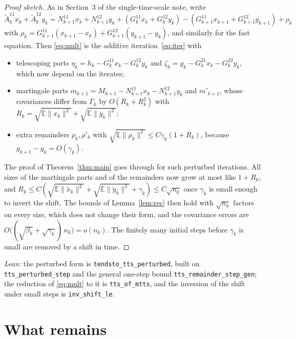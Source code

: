 \documentclass[11pt]{article}
\theoremstyle{definition}
\theoremstyle{remark}
\newcommand{\E}{\mathbb{E}}
\begin{document}
\begin{proof}[Proof sketch]
As in Section~3 of the single-time-scale note, write
$\tilde A^{11}_kx_k + \tilde A^{12}_ky_k = N^{11}_{k+1}x_k + N^{12}_{k+1}y_k + (G^{11}_kx_k + G^{12}_ky_k)
- (G^{11}_{k+1}x_{k+1} + G^{12}_{k+1}y_{k+1}) + \rho_k$ with
$\rho_k = G^{11}_{k+1}(x_{k+1} - x_k) + G^{12}_{k+1}(y_{k+1} - y_k)$, and similarly for the fast
equation. Then \eqref{eq:mult} is the additive iteration~\eqref{eq:iter} with
\begin{itemize}
\item telescoping parts $\eta_k = h_k - G^{11}_kx_k - G^{12}_ky_k$ and $\zeta_k = g_k - G^{21}_kx_k - G^{22}_ky_k$,
  which now depend on the iterates;
\item martingale parts $m_{k+1} = M_{k+1} - N^{11}_{k+1}x_k - N^{12}_{k+1}y_k$ and $m'_{k+1}$, whose
  covariances differ from $\Gamma_k$ by $O(R_k + R_k^2)$ with $R_k = \sqrt{\E\|x_k\|^2} + \sqrt{\E\|y_k\|^2}$;
\item extra remainders $\rho_k, \rho'_k$ with $\sqrt{\E\|\rho_k\|^2} \le C\gamma_k(1 + R_k)$, because
  $y_{k+1} - y_k = O(\gamma_k)$.
\end{itemize}
The proof of Theorem~\ref{thm:main} goes through for such perturbed iterations. All sizes of
the martingale parts and of the remainders now grow at most like $1 + R_k$, and
$R_k \le C(\sqrt{\E\|\tilde x_k\|^2} + \sqrt{\E\|\tilde y_k\|^2} + \gamma_k) \le C\sqrt{n_k}$ once
$\gamma_k$ is small enough to invert the shift. The bounds of Lemma~\ref{lem:rec} then hold with
$\sqrt{n_k}$ factors on every size, which does not change their form, and the covariance errors
are $O\big((\sqrt{\beta_k} + \sqrt{\gamma_k})\,n_k\big) = o(n_k)$. The finitely many initial steps
before $\gamma_k$ is small are removed by a shift in time.
\end{proof}
\noindent\emph{Lean:} the perturbed form is \texttt{tendsto\_tts\_perturbed}, built on
\texttt{tts\_perturbed\_step} and the general one-step bound \texttt{tts\_remainder\_step\_gen};
the reduction of \eqref{eq:mult} to it is \texttt{tts\_of\_mtts}, and the inversion of the shift
under small steps is \texttt{inv\_shift\_le}.

\section{What remains}
\end{document}
